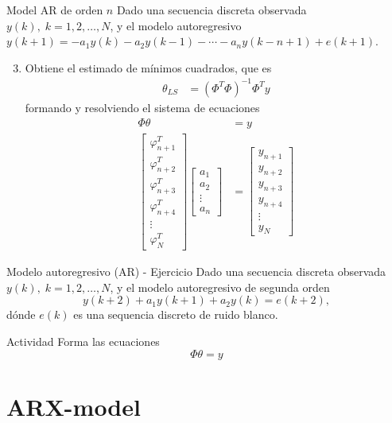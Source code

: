 \documentclass[presentation,aspectratio=169]{beamer}
\begin{document}
\begin{frame}[label={sec:orgb755f58}]{Model AR de orden \(n\)}
Dado una secuencia discreta observada \(y(k), \; k=1,2,\ldots,N\), y el modelo autoregresivo
\(y(k+1) = -a_1y(k)  - a_2y(k-1) - \cdots - a_ny(k-n+1) + e(k+1)\).
\begin{enumerate}
\setcounter{enumi}{2}
\item Obtiene el estimado de mínimos cuadrados, que es
\begin{align*}
 \theta_{LS} &= (\Phi^T\Phi)^{-1}\Phi^T y
 \end{align*}
formando y resolviendo el sistema de ecuaciones
\begin{align*}
\Phi \theta &= y\\
\begin{bmatrix}\varphi_{n+1}^T\\\varphi_{n+2}^T\\\varphi_{n+3}^T\\\varphi_{n+4}^T\\\vdots\\\varphi_{N}^T\end{bmatrix} \begin{bmatrix}a_1\\a_2\\\vdots\\a_n\end{bmatrix} &= \begin{bmatrix}y_{n+1}\\y_{n+2}\\y_{n+3}\\y_{n+4}\\\vdots\\ y_{N}\end{bmatrix}
\end{align*}
\end{enumerate}
\end{frame}


\begin{frame}[label={sec:orge099d3c}]{Modelo autoregresivo (AR) - Ejercicio}
Dado una secuencia discreta observada \(y(k), \; k=1,2,\ldots,N\), y el modelo autoregresivo de segunda orden
\[ y(k+2) + a_1y(k+1) + a_2y(k) = e(k+2),\]
dónde \(e(k)\) es una sequencia discreto de ruido blanco.

\alert{Actividad} Forma las ecuaciones \[ \Phi \theta = y\]
\end{frame}


\section{ARX-model}
\label{sec:org0ba2996}
\end{document}
